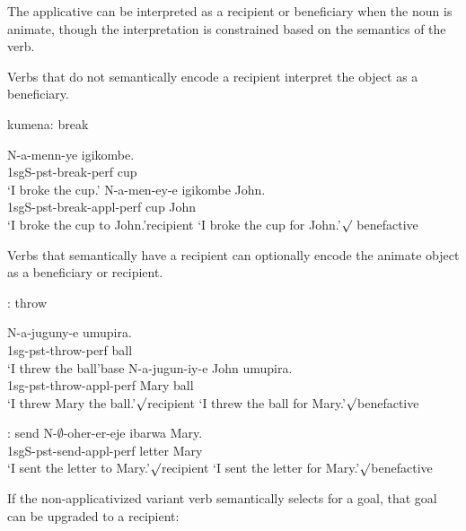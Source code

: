 \documentclass[output=paper]{langsci/langscibook}
\begin{document}
 
 The applicative can be interpreted as a recipient or beneficiary when the noun is animate, though the interpretation is constrained based on the semantics of the verb. 


 Verbs that do not semantically encode a recipient interpret the object as a beneficiary.

\begin{exe}
	\ex\label{break} {\sc kumena}: break
	\begin{xlist}
	\ex\gll N-a-menn-ye igikombe.\\
			{\sc 1sgS-pst-}break-{\sc perf} cup\\
			\glt `I broke the cup.'
	\ex\gll N-a-men-ey-e igikombe John.\\
			{\sc 1sgS-pst-}break-{\sc appl-perf} cup John\\
			\glt *`I broke the cup to John.'\hfill *recipient
			\glt `I broke the cup for John.'\hfill $\surd$ benefactive
\end{xlist}
\end{exe}

 Verbs that semantically have a recipient can optionally encode the animate object as a beneficiary or recipient.
\begin{exe}
	: throw%
\begin{xlist}
		\ex\gll N-a-juguny-e umupira.\\
				{\sc 1sg-pst}-throw-{\sc perf}  ball\\
				\glt `I threw the ball'\hfill base
		\ex\gll N-a-jugun-iy-e John umupira.\\
				{\sc 1sg-pst}-throw-{\sc appl-perf} Mary ball\\
				\glt `I threw Mary the ball.'\hfill $\surd$recipient
				\glt `I threw the ball for Mary.'\hfill $\surd$benefactive
		\end{xlist}
: send
\gll N-$\emptyset$-oher-er-eje ibarwa Mary.\\
		{\sc 1sgS-pst-}send-{\sc appl-perf} letter Mary\\
		\glt `I sent the letter to Mary.'\hfill $\surd$recipient 
		\glt `I sent the letter for Mary.'\hfill $\surd$benefactive 
\end{exe}


 If the non-applicativized variant verb semantically selects for a goal, that goal can be upgraded to a recipient:
\end{document}
